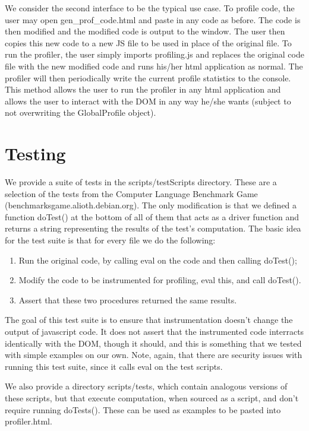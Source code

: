 \documentclass[11pt]{article}
\begin{document}
	We consider the second interface to be the typical use case. To profile code, the user may 
open gen\_prof\_code.html and paste in any code as before. The code is then modified and 
the modified code is output to the window. The user then copies this new code to a new JS file 
to be used in place of the original file. To run the profiler, the user simply imports profiling.js
and replaces the original code file with the new modified code and runs his/her html application 
as normal. The profiler will then periodically write the current profile statistics to the console.
This method allows the user to run the profiler in any html application 
and allows the user to interact with the DOM in any way he/she wants (subject to not overwriting the 
GlobalProfile object).

\section{Testing}
We provide a suite of tests in the scripts/testScripts
directory. These are a selection of the tests from the Computer
Language Benchmark Game (benchmarksgame.alioth.debian.org). The only
modification is that we defined a function doTest() at the bottom of
all of them that acts as a driver function and returns a string
representing the results of the test's computation. The basic idea for
the test suite is that for every file we do the following:
\begin{enumerate}
\item Run the original code, by calling eval on the code and then
  calling doTest();
\item Modify the code to be instrumented for profiling, eval this, and call
  doTest().
\item Assert that these two procedures returned the same results. 
\end{enumerate}
The goal of this test suite is to ensure that instrumentation doesn't
change the output of javascript code. It does not assert that the
instrumented code interracts identically with the DOM, though it
should, and this is something that we tested with simple examples on
our own. Note, again, that there are security issues with running this
test suite, since it calls eval on the test scripts. 

We also provide a directory scripts/tests, which contain analogous
versions of these scripts, but that execute computation, when sourced
as a script, and don't require running doTests(). These can be used as
examples to be pasted into profiler.html.
\end{document}
